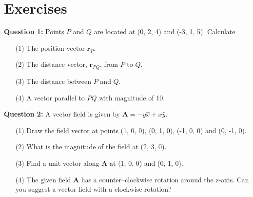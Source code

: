 \documentclass[12pt,a4paper]{article}
\begin{document}
\section{Exercises}
\noindent\textbf{Question 1:} Points $P$ and $Q$ are located at (0, 2, 4) and (-3, 1, 5). Calculate
\begin{enumerate}
\item[(1)] The position vector $\textbf{r}_P$.
\item[(2)] The distance vector, $\textbf{r}_{PQ}$, from $P$ to $Q$.
\item[(3)] The distance between $P$ and $Q$.
\item[(4)] A vector parallel to $PQ$ with magnitude of 10.
\end{enumerate}
\noindent\textbf{Question 2:} A vector field is given by $\textbf{A}=-y\hat x+x\hat y$.
\begin{enumerate}
\item[(1)] Draw the field vector at points (1, 0, 0), (0, 1, 0), (-1, 0, 0) and (0, -1, 0).
\item[(2)] What is the magnitude of the field at (2, 3, 0).
\item[(3)] Find a unit vector along \textbf{A} at (1, 0, 0) and (0, 1, 0).
\item[(4)] The given field \textbf{A} has a counter--clockwise rotation around the z-axis. Can you suggest a vector field with a clockwise rotation?
\end{enumerate}


\end{document}
